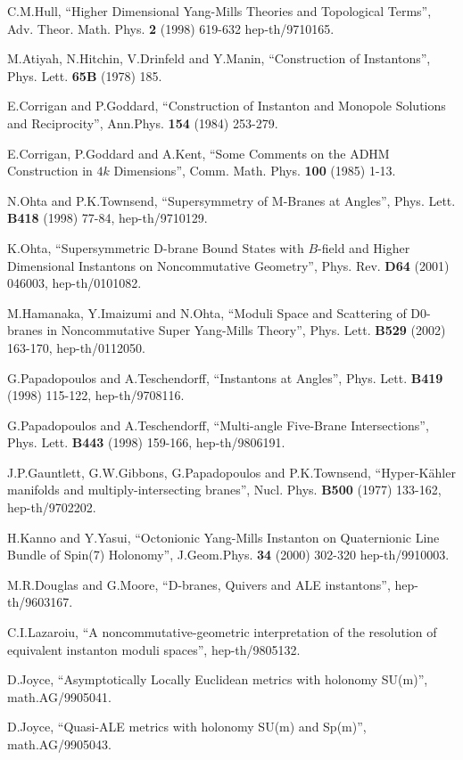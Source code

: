 \documentclass[a4paper,12pt]{article}
\begin{document}
\begin{thebibliography}{999}
C.M.Hull, ``Higher Dimensional Yang-Mills Theories and Topological Terms'', 
Adv. Theor. Math. Phys. \textbf{2} (1998) 619-632 hep-th/9710165.

M.Atiyah, N.Hitchin, V.Drinfeld and Y.Manin, ``Construction of Instantons'',
 Phys. Lett. \textbf{65B} (1978) 185.

E.Corrigan and P.Goddard, ``Construction of Instanton and Monopole Solutions
 and Reciprocity'', Ann.Phys. \textbf{154} (1984) 253-279.

E.Corrigan, P.Goddard and A.Kent, ``Some Comments on the ADHM Construction
 in $4k$ Dimensions'', Comm. Math. Phys. \textbf{100} (1985) 1-13.

N.Ohta and P.K.Townsend, ``Supersymmetry of M-Branes at Angles'', 
Phys. Lett. \textbf{B418} (1998) 77-84, hep-th/9710129.

K.Ohta, ``Supersymmetric D-brane Bound States with $B$-field and
Higher Dimensional Instantons on Noncommutative Geometry'',
 Phys. Rev. \textbf{D64} (2001) 046003,
 hep-th/0101082.

M.Hamanaka, Y.Imaizumi and N.Ohta, ``Moduli Space and Scattering of D0-branes 
in Noncommutative Super Yang-Mills Theory'', Phys. Lett. 
\textbf{B529} (2002) 163-170, hep-th/0112050.

G.Papadopoulos and A.Teschendorff, ``Instantons at Angles'', Phys. Lett.
 \textbf{B419} (1998) 115-122, hep-th/9708116.

G.Papadopoulos and A.Teschendorff, ``Multi-angle Five-Brane Intersections'',
 Phys. Lett. \textbf{B443} (1998) 159-166, hep-th/9806191.

J.P.Gauntlett, G.W.Gibbons, G.Papadopoulos and P.K.Townsend, 
``Hyper-K\"{a}hler manifolds and multiply-intersecting branes'', 
Nucl. Phys. \textbf{B500} (1977) 133-162, hep-th/9702202.

H.Kanno and Y.Yasui, ``Octonionic Yang-Mills Instanton on Quaternionic Line 
Bundle of Spin(7) Holonomy'', J.Geom.Phys. \textbf{34} (2000) 302-320 
hep-th/9910003.

M.R.Douglas and G.Moore, ``D-branes, Quivers and ALE instantons'', 
hep-th/9603167.

C.I.Lazaroiu, ``A noncommutative-geometric interpretation of the 
resolution of equivalent instanton moduli spaces'', hep-th/9805132.

D.Joyce, ``Asymptotically Locally Euclidean metrics with holonomy SU(m)'', 
math.AG/9905041.

D.Joyce, ``Quasi-ALE metrics with holonomy SU(m) and Sp(m)'', 
math.AG/9905043.


\end{thebibliography}
\end{document}
